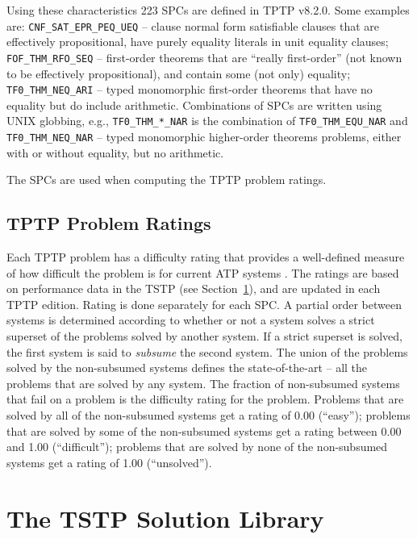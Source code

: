 \documentclass[runningheads]{llncs}
\begin{document}
Using these characteristics 223 SPCs are defined in TPTP v8.2.0.
Some examples are:
{\tt CNF\_SAT\_EPR\_PEQ\_UEQ} -- clause normal form satisfiable clauses that are effectively
propositional, have purely equality literals in unit equality clauses;
{\tt FOF\_THM\_RFO\_SEQ} -- first-order theorems that are ``really first-order'' (not known
to be effectively propositional), and contain some (not only) equality;
{\tt TF0\_THM\_NEQ\_ARI} -- typed monomorphic first-order theorems that have no equality but do
include arithmetic.
Combinations of SPCs are written using UNIX globbing, e.g., {\tt TF0\_THM\_*\_NAR} is the
combination of {\tt TF0\_THM\_EQU\_NAR} and {\tt TF0\_THM\_NEQ\_NAR} -- typed monomorphic 
higher-order theorems problems, either with or without equality, but no arithmetic.

The SPCs are used when computing the TPTP problem ratings.

\subsection{TPTP Problem Ratings}
\label{Ratings}

Each TPTP problem has a difficulty rating that provides a well-defined measure of how difficult 
the problem is for current ATP systems \cite{SS01}.
The ratings are based on performance data in the TSTP (see Section~\ref{TSTP}), and are updated
in each TPTP edition.
Rating is done separately for each SPC.
A partial order between systems is determined according to whether or not a system solves a strict 
superset of the problems solved by another system. 
If a strict superset is solved, the first system is said to {\em subsume} the second system. 
The union of the problems solved by the non-subsumed systems defines the state-of-the-art -- all 
the problems that are solved by any system. 
The fraction of non-subsumed systems that fail on a problem is the difficulty rating for the 
problem. 
Problems that are solved by all of the non-subsumed systems get a rating of 0.00 (``easy'');
problems that are solved by some of the non-subsumed systems get a rating between 
0.00 and 1.00 (``difficult''); 
problems that are solved by none of the non-subsumed systems get a rating of 1.00 (``unsolved'').

\section{The TSTP Solution Library}
\label{TSTP}
\end{document}
